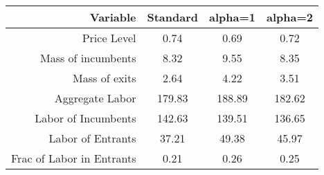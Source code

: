 \begin{tabular}{rccc}
Variable & Standard & alpha=1 & alpha=2 \\
\hline 
Price Level & 0.74 & 0.69 & 0.72 \\
Mass of incumbents & 8.32 & 9.55 & 8.35 \\
Mass of exits & 2.64 & 4.22 & 3.51 \\
Aggregate Labor & 179.83 & 188.89 & 182.62 \\
Labor of Incumbents & 142.63 & 139.51 & 136.65 \\
Labor of Entrants & 37.21 & 49.38 & 45.97 \\
Frac of Labor in Entrants & 0.21 & 0.26 & 0.25 \\
\hline 
\end{tabular}
